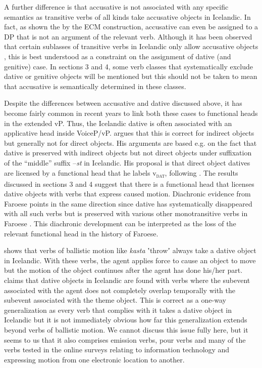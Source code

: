 \documentclass[output=paper,modfonts,nonflat]{langsci/langscibook}
\begin{document}
A further difference is that accusative is not associated with any specific semantics as transitive verbs of all kinds take accusative objects in Icelandic. In fact, as shown the by the ECM construction, accusative can even be assigned to a DP that is not an argument of the relevant verb. Although it has been observed that certain sublasses of transitive verbs in Icelandic only allow accusative objects \citep{Jónsson2013a}, this is best understood as a constraint on the assignment of dative (and genitive) case. In sections 3 and 4, some verb classes that systematically exclude dative or genitive objects will be mentioned but this should not be taken to mean that accusative is semantically determined in these classes.

Despite the differences between accusative and dative discussed above, it has become fairly common in recent years to link both these cases to functional heads in the extended vP. Thus, the Icelandic dative is often associated with an applicative head inside VoiceP/vP. \citet[128-138]{Wood2015} argues that this is correct for indirect objects but generally not for direct objects. His arguments are based e.g. on the fact that dative is preserved with indirect objects but not direct objects under suffixation of the “middle” suffix –\textit{st} in Icelandic. His proposal is that direct object datives are licensed by a functional head that he labels v\textsc{\textsubscript{dat}}, following \citet{Svenonius2006}. The results discussed in sections 3 and 4 suggest that there is a functional head that licenses dative objects with verbs that express caused motion. Diachronic evidence from Faroese points in the same direction since dative has systematically disappeared with all such verbs but is preserved with various other monotransitive verbs in Faroese \citep{Jónsson2009}. This diachronic development can be interpreted as the loss of the relevant functional head in the history of Faroese.

\citet{Svenonius2002} shows that verbs of ballistic motion like \textit{kasta} ʽthrowʼ always take a dative object in Icelandic. With these verbs, the agent applies force to cause an object to move but the motion of the object continues after the agent has done his/her part. \citet{Svenonius2002} claims that dative objects in Icelandic are found with verbs where the subevent associated with the agent does not completely overlap temporally with the subevent associated with the theme object. This is correct as a one-way generalization as every verb that complies with it takes a dative object in Icelandic but it is not immediately obvious how far this generalization extends beyond verbs of ballistic motion. We cannot discuss this issue fully here, but it seems to us that it also comprises emission verbs, pour verbs and many of the verbs tested in the online surveys relating to information technology and expressing motion from one electronic location to another. 
\end{document}
